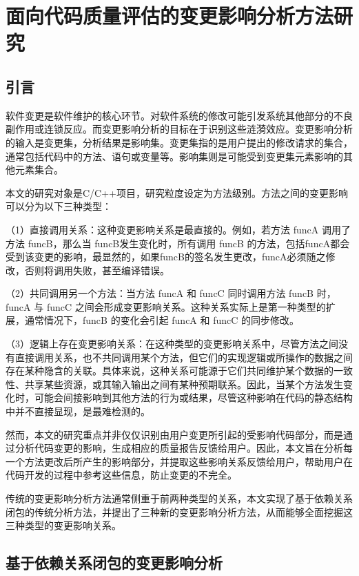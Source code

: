 \chapter{面向代码质量评估的变更影响分析方法研究}
\section{引言}

软件变更是软件维护的核心环节。对软件系统的修改可能引发系统其他部分的不良副作用或连锁反应。而变更影响分析的目标在于识别这些涟漪效应。变更影响分析的输入是变更集，分析结果是影响集。变更集指的是用户提出的修改请求的集合，通常包括代码中的方法、语句或变量等。影响集则是可能受到变更集元素影响的其他元素集合。

本文的研究对象是C/C++项目，研究粒度设定为方法级别。方法之间的变更影响可以分为以下三种类型：

（1）直接调用关系：这种变更影响关系是最直接的。例如，若方法 funcA 调用了方法 funcB，那么当 funcB发生变化时，所有调用 funcB 的方法，包括funcA都会受到该变更的影响，最显然的，如果funcB的签名发生更改，funcA必须随之修改，否则将调用失败，甚至编译错误。

（2）共同调用另一个方法：当方法 funcA 和 funcC 同时调用方法 funcB 时，funcA 与 funcC 之间会形成变更影响关系。这种关系实际上是第一种类型的扩展，通常情况下，funcB 的变化会引起 funcA 和 funcC 的同步修改。

（3）逻辑上存在变更影响关系：在这种类型的变更影响关系中，尽管方法之间没有直接调用关系，也不共同调用某个方法，但它们的实现逻辑或所操作的数据之间存在某种隐含的关联。具体来说，这种关系可能源于它们共同维护某个数据的一致性、共享某些资源，或其输入输出之间有某种预期联系。因此，当某个方法发生变化时，可能会间接影响到其他方法的行为或结果，尽管这种影响在代码的静态结构中并不直接显现，是最难检测的。

然而，本文的研究重点并非仅仅识别由用户变更所引起的受影响代码部分，而是通过分析代码变更的影响，生成相应的质量报告反馈给用户。因此，本文旨在分析每一个方法更改后所产生的影响部分，并提取这些影响关系反馈给用户，帮助用户在代码开发的过程中参考这些信息，防止变更的不完全。

传统的变更影响分析方法通常侧重于前两种类型的关系，本文实现了基于依赖关系闭包的传统分析方法，并提出了三种新的变更影响分析方法，从而能够全面挖掘这三种类型的变更影响关系。

\section{基于依赖关系闭包的变更影响分析}

